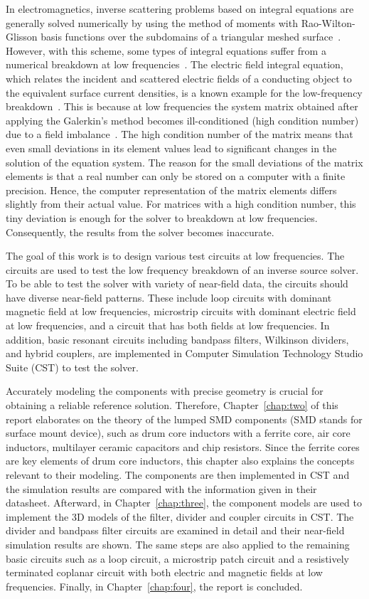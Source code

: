 In electromagnetics, inverse scattering problems based on integral equations are generally solved numerically by using the method of moments with Rao-Wilton-Glisson basis functions over the subdomains of a triangular meshed surface~\cite{8293221}. However, with this scheme, some types of integral equations suffer from a numerical breakdown at low frequencies~\cite{5997218}. The electric field integral equation, which relates the incident and scattered electric fields of a conducting object to the equivalent surface current densities, is a known example for the low-frequency breakdown~\cite{8293221}. This is because at low frequencies the system matrix obtained after applying the Galerkin's method becomes ill-conditioned (high condition number) due to a field imbalance~\cite{5997218}. The high condition number of the matrix means that even small deviations in its element values lead to significant changes in the solution of the equation system. The reason for the small deviations of the matrix elements is that a real number can only be stored on a computer with a finite precision. Hence, the computer representation of the matrix elements differs slightly from their actual value. For matrices with a high condition number, this tiny deviation is enough for the solver to breakdown at low frequencies. Consequently, the results from the solver becomes inaccurate.

The goal of this work is to design various test circuits at low frequencies. The circuits are used to test the low frequency breakdown of an inverse source solver. To be able to test the solver with variety of near-field data, the circuits should have diverse near-field patterns. These include loop circuits with dominant magnetic field at low frequencies, microstrip circuits with dominant electric field at low frequencies, and a circuit that has both fields at low frequencies. In addition, basic resonant circuits including bandpass filters, Wilkinson dividers, and hybrid couplers, are implemented in Computer Simulation Technology Studio Suite (CST) to test the solver. 

Accurately modeling the components with precise geometry is crucial for obtaining a reliable reference solution. Therefore, Chapter~\ref{chap:two} of this report elaborates on the theory of the lumped SMD components (SMD stands for surface mount device), such as drum core inductors with a ferrite core, air core inductors, multilayer ceramic capacitors and chip resistors. Since the ferrite cores are key elements of drum core inductors, this chapter also explains the concepts relevant to their modeling. The components are then implemented in CST and the simulation results are compared with the information given in their datasheet. Afterward, in Chapter~\ref{chap:three}, the component models are used to implement the 3D models of the filter, divider and coupler circuits in CST. The divider and bandpass filter circuits are examined in detail and their near-field simulation results are shown. The same steps are also applied to the remaining basic circuits such as a loop circuit, a microstrip patch circuit and a resistively terminated coplanar circuit with both electric and magnetic fields at low frequencies. Finally, in Chapter~\ref{chap:four}, the report is concluded.

